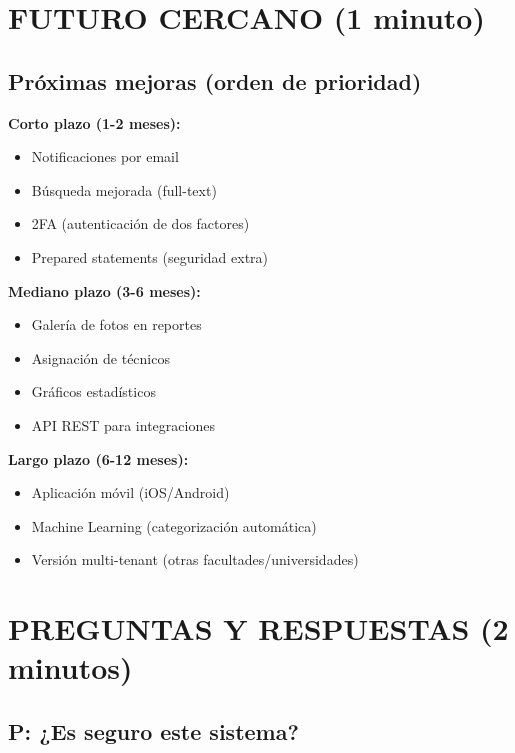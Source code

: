 \documentclass[12pt, a4paper, spanish]{article}
\begin{document}
\section{FUTURO CERCANO (1 minuto)}

\subsection{Próximas mejoras (orden de prioridad)}

\begin{tcolorbox}[colback=verde!10, colframe=verde!50, title=Mejoras Planificadas]
\textbf{Corto plazo (1-2 meses):}
\begin{itemize}
    \item Notificaciones por email
    \item Búsqueda mejorada (full-text)
    \item 2FA (autenticación de dos factores)
    \item Prepared statements (seguridad extra)
\end{itemize}

\textbf{Mediano plazo (3-6 meses):}
\begin{itemize}
    \item Galería de fotos en reportes
    \item Asignación de técnicos
    \item Gráficos estadísticos
    \item API REST para integraciones
\end{itemize}

\textbf{Largo plazo (6-12 meses):}
\begin{itemize}
    \item Aplicación móvil (iOS/Android)
    \item Machine Learning (categorización automática)
    \item Versión multi-tenant (otras facultades/universidades)
\end{itemize}
\end{tcolorbox}

\newpage

\section{PREGUNTAS Y RESPUESTAS (2 minutos)}

\subsection{P: ¿Es seguro este sistema?}
\end{document}
